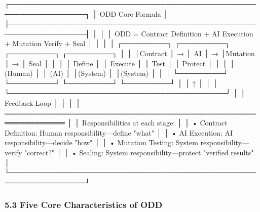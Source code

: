 \documentclass[
]{article}
\newenvironment{Shaded}{}{}
\newcommand{\NormalTok}[1]{#1}
\begin{document}
\begin{Shaded}
\begin{Highlighting}[]
\NormalTok{┌─────────────────────────────────────────────────────────────────┐}
\NormalTok{│                       ODD Core Formula                           │}
\NormalTok{├─────────────────────────────────────────────────────────────────┤}
\NormalTok{│                                                                  │}
\NormalTok{│    ODD = Contract Definition + AI Execution + Mutation Verify + Seal │}
\NormalTok{│                                                                  │}
\NormalTok{│    ┌─────────┐   ┌─────────┐   ┌─────────┐   ┌─────────┐       │}
\NormalTok{│    │Contract │ → │   AI    │ → │Mutation │ → │  Seal   │       │}
\NormalTok{│    │ Define  │   │ Execute │   │  Test   │   │ Protect │       │}
\NormalTok{│    │ (Human) │   │  (AI)   │   │(System) │   │(System) │       │}
\NormalTok{│    └─────────┘   └─────────┘   └─────────┘   └─────────┘       │}
\NormalTok{│        ↑                                           │             │}
\NormalTok{│        └───────────────────────────────────────────┘             │}
\NormalTok{│                        Feedback Loop                             │}
\NormalTok{│                                                                  │}
\NormalTok{│  ══════════════════════════════════════════════════════════════  │}
\NormalTok{│  Responsibilities at each stage:                                │}
\NormalTok{│  • Contract Definition: Human responsibility—define "what"      │}
\NormalTok{│  • AI Execution: AI responsibility—decide "how"                 │}
\NormalTok{│  • Mutation Testing: System responsibility—verify "correct?"    │}
\NormalTok{│  • Sealing: System responsibility—protect "verified results"    │}
\NormalTok{└─────────────────────────────────────────────────────────────────┘}
\end{Highlighting}
\end{Shaded}

\hypertarget{53-five-core-characteristics-of-odd}{%
\subsubsection{5.3 Five Core Characteristics of
ODD}\label{53-five-core-characteristics-of-odd}}
\end{document}
